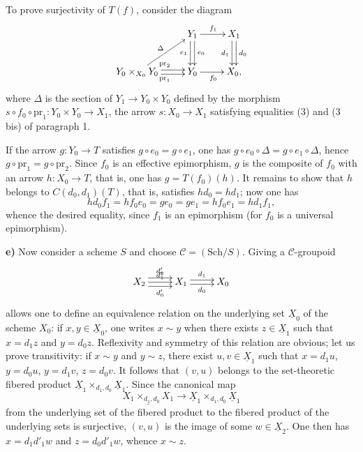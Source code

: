 To prove surjectivity of $T(f)$, consider the diagram
\[
\xymatrix{&Y_1\ar[r]^{f_1}\ar@<.5ex>[d]^{e_0}\ar@<-.5ex>[d]_{e_1}&X_1\ar@<.5ex>[d]^{d_0}\ar@<-.5ex>[d]_{d_1}\\Y_0\times_{X_0}Y_0\ar[ur]^\Delta\ar@<.5ex>[r]^{\mathrm{pr}_2}\ar@<-.5ex>[r]_{\mathrm{pr}_1}&Y_0\ar[r]_{f_0}&X_0,}
\]
where $\Delta$ is the section of $Y_1\to Y_0\times Y_0$ defined by the morphism $s\circ f_0\circ\mathrm{pr}_1:Y_0\times Y_0\to X_1$, the arrow $s:X_0\to X_1$ satisfying equalities (3) and (3 bis) of paragraph 1.

If the arrow $g:Y_0\to T$ satisfies $g\circ e_0=g\circ e_1$, one has $g\circ e_0\circ\Delta=g\circ e_1\circ\Delta$, hence $g\circ\mathrm{pr}_1=g\circ\mathrm{pr}_2$. Since $f_0$ is an effective epimorphism, $g$ is the composite of $f_0$ with an arrow $h:X_0\to T$, that is, one has $g=T(f_0)(h)$. It remains to show that $h$ belongs to $C(d_0,d_1)(T)$, that is, satisfies $hd_0=hd_1$; now one has
\[
hd_0f_1=hf_0e_0=ge_0=ge_1=hf_0e_1=hd_1f_1,
\]
whence the desired equality, since $f_1$ is an epimorphism (for $f_0$ is a universal epimorphism).

\textbf{e)} Now consider a scheme $S$ and choose $\mathcal C=(\mathrm{Sch}/S)$. Giving a $\mathcal C$-groupoid
\[
\xymatrix{X_2\ar@<1ex>[r]^{d'_2}\ar[r]^{d'_1}\ar@<-1ex>[r]_{d'_0}&X_1\ar@<.5ex>[r]^{d_1}\ar@<-.5ex>[r]_{d_0}&X_0}
\]
allows one to define an equivalence relation on the underlying set $\underline X_0$ of the scheme $X_0$: if $x,y\in\underline X_0$, one writes $x\sim y$ when there exists $z\in\underline X_1$ such that $x=d_1z$ and $y=d_0z$. Reflexivity and symmetry of this relation are obvious; let us prove transitivity: if $x\sim y$ and $y\sim z$, there exist $u,v\in\underline X_1$ such that $x=d_1u$, $y=d_0u$, $y=d_1v$, $z=d_0v$. It follows that $(v,u)$ belongs to the set-theoretic fibered product $\underline X_1\times_{d_1,d_0}\underline X_1$. Since the canonical map
\[
\underline{X_1\times_{d_1,d_0}X_1}\to\underline X_1\times_{d_1,d_0}\underline X_1
\]
from the underlying set of the fibered product to the fibered product of the underlying sets is surjective, $(v,u)$ is the image of some $w\in\underline X_2$. One then has $x=d_1d'_1w$ and $z=d_0d'_1w$, whence $x\sim z$.

